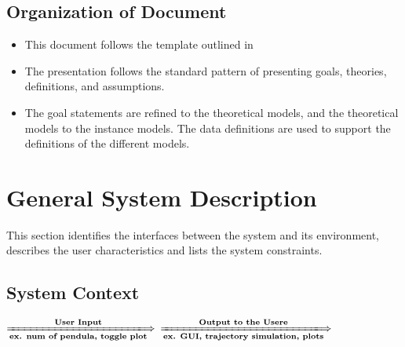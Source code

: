 \documentclass[12pt]{article}
\begin{document}
\subsection{Organization of Document}
\begin{itemize}
\item This document follows the template outlined in \citet{SmithAndLai2005} 
\item The presentation follows the standard pattern of presenting goals,
theories, definitions, and assumptions.
\item The goal statements are refined to the theoretical models, and the
theoretical
models to the instance models. The data definitions are used to support the
definitions of the different models.
\end{itemize}

\section{General System Description}
This section identifies the interfaces between the system and its environment,
describes the user characteristics and lists the system constraints.

\subsection{System Context}

\begin{center}
 $ \xLongrightarrow[\textbf{ex. num of pendula, 
toggle plot}]{\textbf{User Input}} $\framebox{\textbf { \progname}}
$ \xLongrightarrow[\textbf{ex. GUI, trajectory simulation, plots}] 
{\textbf{Output to the Usere}}$\\
\end{center}
\end{document}
